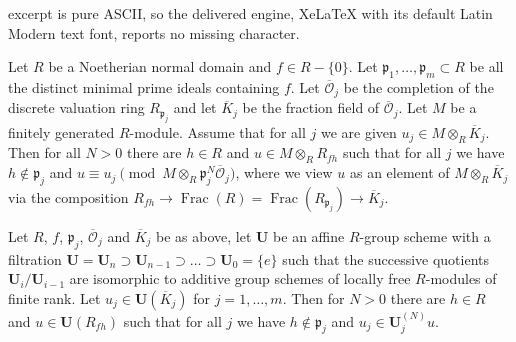 \documentclass[10pt,a4paper]{amsart}
\DeclareMathOperator{\Frac}{Frac}
\newcommand\bU{{\mathbf U}}
\newcommand\cO{{\mathcal{O}}}
\newcommand\fp{{\mathfrak{p}}}
\begin{document}
excerpt is pure ASCII, so the delivered engine, XeLaTeX with its default Latin Modern text font, reports no missing character.
\begin{lemma}\label{lm:Approximation}
  Let $R$ be a Noetherian normal domain and $f\in R-\{0\}$. Let $\fp_1,\ldots,\fp_m\subset R$ be all the distinct minimal prime ideals containing $f$. Let $\overline\cO_j$ be the completion of the discrete valuation ring $R_{\fp_j}$ and let $\overline K_j$ be the fraction field of $\overline\cO_j$. Let $M$ be a finitely generated $R$-module. Assume that for all $j$ we are given $u_j\in M\otimes_R\overline K_j$. Then for all $N>0$ there are $h\in R$ and $u\in M\otimes_R R_{fh}$ such that for all $j$ we have $h\notin\fp_j$ and $u\equiv u_j\pmod{M\otimes_R\fp_j^N\overline\cO_j}$, where we view $u$ as an element of $M\otimes_R\overline K_j$ via the composition $R_{fh}\to\Frac(R)=\Frac(R_{\fp_j})\to\overline K_j$.
\end{lemma}

\begin{lemma}\label{lm:ApproxU}
  Let $R$, $f$, $\fp_j$, $\overline\cO_j$ and $\overline K_j$ be as above, let $\bU$ be an affine $R$-group scheme with a filtration $\bU=\bU_n\supset\bU_{n-1}\supset\ldots\supset\bU_0=\{e\}$ such that the successive quotients $\bU_i/\bU_{i-1}$ are isomorphic to additive group schemes of locally free $R$-modules of finite rank. Let $u_j\in\bU(\overline K_j)$ for $j=1,\ldots,m$. Then for $N>0$ there are $h\in R$ and $u\in\bU(R_{fh})$ such that for all $j$ we have $h\notin\fp_j$ and $u_j\in \bU^{(N)}_ju$.
\end{lemma}
\end{document}
